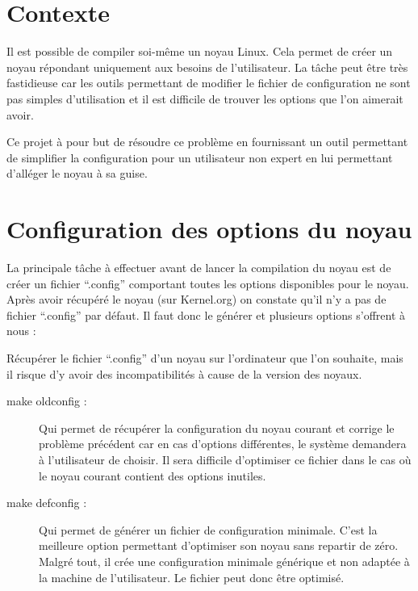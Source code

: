 \documentclass[16pts]{report}
\begin{document}


\chapter{Contexte}
Il est possible de compiler soi-même un noyau Linux. Cela permet de créer
    un noyau répondant uniquement aux besoins de l’utilisateur. La tâche peut
    être très fastidieuse car les outils permettant de modifier le fichier
    de configuration ne sont pas simples d’utilisation et il est difficile
    de trouver les options que l’on aimerait avoir.

Ce projet à pour but de résoudre ce problème en fournissant un outil permettant
    de simplifier la configuration pour un utilisateur non expert en
    lui permettant d’alléger le noyau à sa guise.

\chapter{Configuration des options du noyau}
La principale tâche à effectuer avant de lancer la compilation du noyau est
    de créer un fichier “.config” comportant toutes les options disponibles
    pour le noyau.  Après avoir récupéré le noyau (sur Kernel.org) on constate
    qu’il n’y a pas de fichier “.config” par défaut. Il faut donc le générer et
    plusieurs options s’offrent à nous :

Récupérer le fichier “.config” d’un noyau sur l’ordinateur que l’on souhaite,
    mais il risque d’y avoir des incompatibilités à cause de la version
    des noyaux.

\begin{description}
    \item[make oldconfig :] Qui permet de récupérer la configuration du noyau
        courant et corrige le problème précédent car en cas d’options
        différentes, le système demandera à l’utilisateur de choisir. Il sera
        difficile d’optimiser ce fichier dans le cas où le noyau courant
        contient des options inutiles.

    \item[make defconfig :] Qui permet de générer un fichier de configuration
        minimale.  C’est la meilleure option permettant d’optimiser son noyau
        sans repartir de zéro.  Malgré tout, il crée une configuration minimale
        générique et non adaptée à la machine de l’utilisateur.
        Le fichier peut donc être optimisé.
\end{description}
\end{document}
